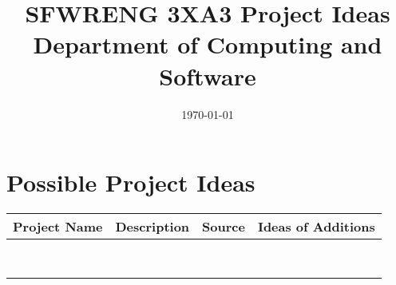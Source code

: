 \documentclass[12pt]{article}
\title{
    SFWRENG 3XA3 Project Ideas\\
    \large Department of Computing and Software\\
}
\author{}
\date{\today}
\begin{document}
\maketitle
\section*{Possible Project Ideas}
\begin{table}[h]
\begin{tabular}{|l|l|l|l|}
\hline
\textbf{Project Name} & \textbf{Description} & \textbf{Source} & \textbf{Ideas of Additions} \\ \hline
                      &                      &                 &                             \\ \hline
                      &                      &                 &                             \\ \hline
                      &                      &                 &                             \\ \hline
                      &                      &                 &                             \\ \hline
                      &                      &                 &                             \\ \hline
                      &                      &                 &                             \\ \hline
                      &                      &                 &                             \\ \hline
                      &                      &                 &                             \\ \hline
\end{tabular}
\end{table}
\end{document}
